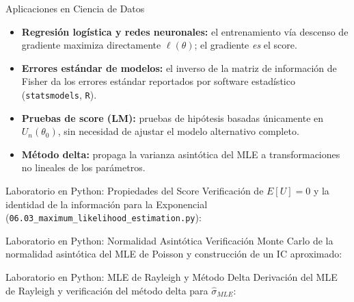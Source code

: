 \documentclass[10pt, aspectratio=169]{beamer}
\begin{document}
\begin{frame}{Aplicaciones en Ciencia de Datos}
  \footnotesize
  \begin{itemize}\itemsep=0.1cm
    \item \textbf{Regresión logística y redes neuronales:} el entrenamiento vía descenso de gradiente maximiza directamente $\ell(\theta)$; el gradiente \emph{es} el score. \pause
    \item \textbf{Errores estándar de modelos:} el inverso de la matriz de información de Fisher da los errores estándar reportados por software estadístico (\texttt{statsmodels}, \texttt{R}). \pause
    \item \textbf{Pruebas de score (LM):} pruebas de hipótesis basadas únicamente en $U_n(\theta_0)$, sin necesidad de ajustar el modelo alternativo completo. \pause
    \item \textbf{Método delta:} propaga la varianza asintótica del MLE a transformaciones no lineales de los parámetros.
  \end{itemize}
\end{frame}

\begin{frame}[fragile]{Laboratorio en Python: Propiedades del Score}
  \scriptsize
  Verificación de $E[U]=0$ y la identidad de la información para la Exponencial (\texttt{06.03\_maximum\_likelihood\_estimation.py}):
  {
  }
\end{frame}

\begin{frame}[fragile]{Laboratorio en Python: Normalidad Asintótica}
  \scriptsize
  Verificación Monte Carlo de la normalidad asintótica del MLE de Poisson y construcción de un IC aproximado:
  {
  }
\end{frame}

\begin{frame}[fragile]{Laboratorio en Python: MLE de Rayleigh y Método Delta}
  \scriptsize
  Derivación del MLE de Rayleigh y verificación del método delta para $\hat\sigma_{MLE}$:
  {
  }
\end{frame}
\end{document}
